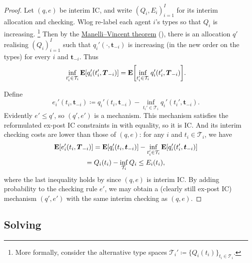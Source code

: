 \begin{proof}
	Let $(q,e)$ be interim IC,
	and write $(Q_i,E_i)_{i=1}^I$ for its interim allocation and checking.
	Wlog re-label each agent $i$'s types so that $Q_i$ is increasing.%
		\footnote{More formally, consider the alternative type spaces $\mathcal{T}_i' \coloneqq \{ Q_i(t_i) \}_{t_i \in \mathcal{T}_i}$.}
	Then by the \hyperref[theorem:manellivincent]{Manelli--Vincent theorem} (),
	there is an allocation $q'$ realising $(Q_i)_{i=1}^I$ such that $q_i'(\cdot,\boldsymbol{t}_{-i})$ is increasing (in the new order on the types) for every $i$ and $\boldsymbol{t}_{-i}$.
	Thus
	\begin{equation*}
		\inf_{t_i' \in \mathcal{T}_i} \E
		\left[ q_i'(t_i',\boldsymbol{T}_{-i}) \right]
		= \E \left[ \inf_{t_i' \in \mathcal{T}_i} 
		q_i'(t_i',\boldsymbol{T}_{-i}) \right] .
	\end{equation*}

	Define
	\begin{equation*}
		e_i'(t_i,\boldsymbol{t}_{-i})
		\coloneqq q_i'(t_i,\boldsymbol{t}_{-i})
		- \inf_{t_i' \in \mathcal{T}_i} q_i'(t_i',\boldsymbol{t}_{-i}) .
	\end{equation*}
	Evidently $e' \leq q'$, so $\left( q', e' \right)$ is a mechanism.
	This mechanism
	satisfies the reformulated ex-post IC constraints in 
	with equality,
	so it is IC.
	And its interim checking costs are lower than those of $(q,e)$:
	for any $i$ and $t_i \in \mathcal{T}_i$, we have
	\begin{multline*}
		\E\left[ e_i'(t_i,\boldsymbol{T}_{-i}) \right]
		= \E\left[ q_i'(t_i,\boldsymbol{t}_{-i}) \right]
		- \inf_{t_i' \in \mathcal{T}_i}
		\E\left[ q_i'(t_i',\boldsymbol{t}_{-i}) \right]
		\\
		= Q_i(t_i)
		- \inf_{\mathcal{T}_i} Q_i
		\leq E_i(t_i) ,
	\end{multline*}
	where the last inequality holds by  since $(q,e)$ is interim IC.
	By adding probability to the checking rule $e'$,
	we may obtain a (clearly still ex-post IC) mechanism $(q',e')$
	with the same interim checking as $(q,e)$.
\end{proof}



\subsection{Solving}
\label{sec:ch2:bdl14:solving}

